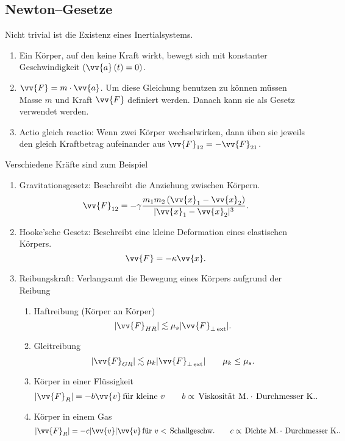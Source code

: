 \documentclass[a4paper,12pt]{article}
\numberwithin{equation}{section}
\begin{document}
\subsection{Newton--Gesetze}
Nicht trivial ist die Existenz eines Inertialsystems.
\begin{enumerate}[label=\arabic*)]
        \item Ein Körper, auf den keine Kraft wirkt, bewegt sich mit konstanter Geschwindigkeit $\left(\vv{a}\left(t\right)=0\right)$.
        \item $\vv{F}=m\cdot \vv{a}$. Um diese Gleichung benutzen zu können müssen Masse $m$ und Kraft $\vv{F}$ definiert werden. Danach kann sie als Gesetz verwendet werden.
        \item Actio gleich reactio: Wenn zwei Körper wechselwirken, dann üben sie jeweils den gleich Kraftbetrag aufeinander aus $\vv{F}_{12}=-\vv{F}_{21}$.
\end{enumerate}
Verschiedene Kräfte sind zum Beispiel
\begin{enumerate}[label=\arabic*)]
        \item Gravitationsgesetz: Beschreibt die Anziehung zwischen Körpern.
                \[ 
                        \vv{F}_{12}=-\gamma \dfrac{m_1m_2\left(\vv{x}_1-\vv{x}_2\right)}{|\vv{x}_1-\vv{x}_2|^3} 
                .\] 
        \item Hooke'sche Gesetz: Beschreibt eine kleine Deformation eines elastischen Körpers.
                \[ 
                        \vv{F}=-\kappa \vv{x}
                .\] 
        \item Reibungskraft: Verlangsamt die Bewegung eines Körpers aufgrund der Reibung
                \begin{enumerate}[label=\alph*)]
                        \item Haftreibung (Körper an Körper)
                                \[ 
                                        |\vv{F}_{HR}|\lesssim \mu _s|\vv{F}_{\perp\,\text{ext}}|
                                .\] 
                        \item Gleitreibung 
                                \[ 
                                        |\vv{F}_{GR}|\lesssim \mu _k|\vv{F}_{\perp\,\text{ext}}|\qquad \mu _k\leq \mu _s
                                .\] 
                        \item Körper in einer Flüssigkeit
                                \[ 
                                        |\vv{F}_R|=-b\vv{v}\,\text{für kleine $v$}\qquad b\propto\,\text{Viskosität M.}\cdot \,\text{Durchmesser K.}
                                .\] 
                        \item Körper in einem Gas
                                \[ 
                                        |\vv{F}_R|=-c|\vv{v}|\vv{v}\,\text{für $v<\,\text{Schallgeschw.}$}\qquad c\propto\,\text{Dichte M.}\cdot  \,\text{Durchmesser K.}
                                .\] 
                \end{enumerate}
\end{enumerate}
\end{document}
